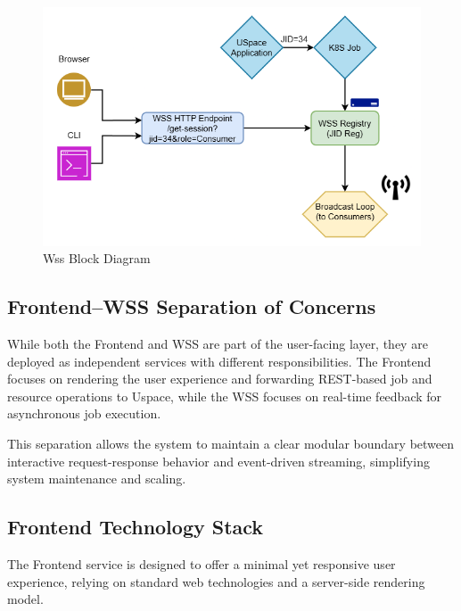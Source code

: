 \begin{figure}[h!]
  \centering
  \includegraphics[width=1\textwidth]{Images/wss-blockdriagram.png}
  \caption{Wss Block Diagram}
  \label{fig:wss-blockdiagram}
\end{figure}

\subsection{Frontend–WSS Separation of Concerns}

While both the Frontend and WSS are part of the user-facing layer, they are deployed as independent services with different responsibilities. The Frontend focuses on rendering the user experience and forwarding REST-based job and resource operations to Uspace, while the WSS focuses on real-time feedback for asynchronous job execution.

This separation allows the system to maintain a clear modular boundary between interactive request-response behavior and event-driven streaming, simplifying system maintenance and scaling.


\subsection{Frontend Technology Stack}

The Frontend service is designed to offer a minimal yet responsive user experience, relying on standard web technologies and a server-side rendering model.

